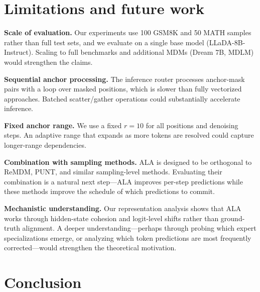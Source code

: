 \documentclass{article} %
\begin{document}
\section{Limitations and future work}
\label{sec:limitations}

\textbf{Scale of evaluation.}
Our experiments use 100 GSM8K and 50 MATH samples rather than full test sets, and we evaluate on a single base model (LLaDA-8B-Instruct).
Scaling to full benchmarks and additional MDMs (Dream 7B, MDLM) would strengthen the claims.

\textbf{Sequential anchor processing.}
The inference router processes anchor-mask pairs with a loop over masked positions, which is slower than fully vectorized approaches.
Batched scatter/gather operations could substantially accelerate inference.

\textbf{Fixed anchor range.}
We use a fixed $r{=}10$ for all positions and denoising steps.
An adaptive range that expands as more tokens are resolved could capture longer-range dependencies.

\textbf{Combination with sampling methods.}
ALA is designed to be orthogonal to ReMDM, PUNT, and similar sampling-level methods.
Evaluating their combination is a natural next step---ALA improves per-step predictions while these methods improve the schedule of which predictions to commit.

\textbf{Mechanistic understanding.}
Our representation analysis shows that ALA works through hidden-state cohesion and logit-level shifts rather than ground-truth alignment.
A deeper understanding---perhaps through probing which expert specializations emerge, or analyzing which token predictions are most frequently corrected---would strengthen the theoretical motivation.


\section{Conclusion}
\label{sec:conclusion}
\end{document}
